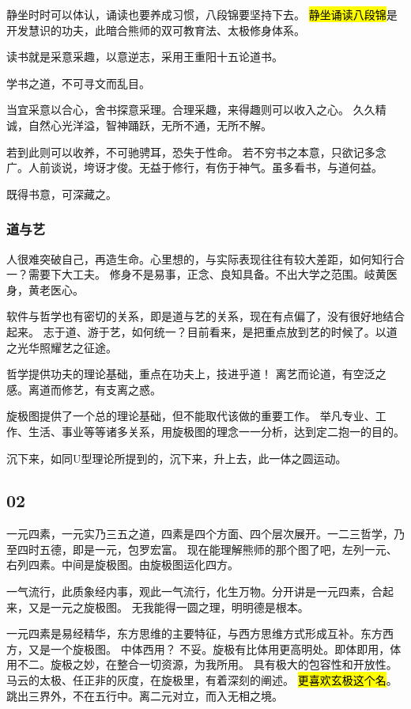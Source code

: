 静坐时时可以体认，诵读也要养成习惯，八段锦要坚持下去。
\hl{静坐诵读八段锦}是开发慧识的功夫，此暗合熊师的双可教育法、太极修身体系。

读书就是采意采趣，以意逆志，采用王重阳十五论道书。
\begin{shadequote}

学书之道，不可寻文而乱目。

当宜采意以合心，舍书探意采理。合理采趣，来得趣则可以收入之心。
久久精诚，自然心光洋溢，智神踊跃，无所不通，无所不解。

若到此则可以收养，不可驰骋耳，恐失于性命。
若不穷书之本意，只欲记多念广。人前谈说，垮讶才俊。无益于修行，有伤于神气。虽多看书，与道何益。

既得书意，可深藏之。
\end{shadequote}

\subsubsection{道与艺}

人很难突破自己，再造生命。心里想的，与实际表现往往有较大差距，如何知行合一？需要下大工夫。
修身不是易事，正念、良知具备。不出大学之范围。岐黄医身，黄老医心。

软件与哲学也有密切的关系，即是道与艺的关系，现在有点偏了，没有很好地结合起来。
志于道、游于艺，如何统一？目前看来，是把重点放到艺的时候了。以道之光华照耀艺之征途。

哲学提供功夫的理论基础，重点在功夫上，技进乎道！
离艺而论道，有空泛之感。离道而修艺，有支离之惑。

旋极图提供了一个总的理论基础，但不能取代该做的重要工作。
举凡专业、工作、生活、事业等等诸多关系，用旋极图的理念一一分析，达到定二抱一的目的。

沉下来，如同U型理论所提到的，沉下来，升上去，此一体之圆运动。

\subsection{02}

一元四素，一元实乃三五之道，四素是四个方面、四个层次展开。一二三哲学，乃至四时五德，即是一元，包罗宏富。
现在能理解熊师的那个图了吧，左列一元、右列四素。中间是旋极图。由旋极图运化四方。

一气流行，此质象经内事，观此一气流行，化生万物。分开讲是一元四素，合起来，又是一元之旋极图。
无我能得一圆之理，明明德是根本。

一元四素是易经精华，东方思维的主要特征，与西方思维方式形成互补。东方西方，又是一个旋极图。
中体西用？ 不妥。旋极有比体用更高明处。即体即用，体用不二。旋极之妙，在整合一切资源，为我所用。
具有极大的包容性和开放性。马云的太极、任正非的灰度，在旋极里，有着深刻的阐述。
\hl{更喜欢玄极这个名}。跳出三界外，不在五行中。离二元对立，而入无相之境。

